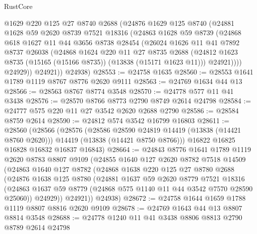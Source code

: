\begin{lexlean}{RustCore}
\begin{coremodule}
          @1629
          @220
          @125
          @27
          @8740
          @2688
          (@24876
            @1629
            @125
            @8740
            (@24881
              @1628
              @59
              @2620
              @8739
              @7521
              @18316
              (@24863
                @1628
                @59
                @8739
                (@24868
                  @618
                  @1627
                  @11
                  @44
                  @3656
                  @8738
                  @28454
                  (@26024
                    @1626
                    @11
                    @41
                    @7892
                    @8737
                    @26038
                    (@24868
                      @1624
                      @220
                      @11
                      @27
                      @8735
                      @2688
                      (@24812 @1623 @8735 (@15165 (@15166 @8735)) (@13838 (@15171 @1623 @11)))
                      @24921))))
              @24929))
          @24921))
      @24938)
@28553 := @24758 @1635
@28560 := @28553 @1641 @1789 @1119 @8767 @8776 @2620 @9111
@28563 := @24769 @1634 @44 @13
@28566 := @28563 @8767 @8774 @3548
@28570 := @24778 @577 @11 @41 @3438
@28576 := @28570 @8766 @8773 @2790 @8749 @2614 @24798
@28584 := @24777 @575 @220 @11 @27 @3542 @2620 @2688 @2790
@28586 := @28584 @8759 @2614
@28590 := @24812 @574 @3542 @16799 @16803
@28611 := @28560
    (@28566
      (@28576
        (@28586 @28590 @24819 @14419 (@13838 (@14421 @8760 @2620)))
        @14419
        (@13838 (@14421 @8750 @8766)))
      @16822
      @16825
      @16828
      @16832
      @16837
      @16843)
@28664 := @24843
    @8776
    @1641
    @1789
    @1119
    @2620
    @8783
    @8807
    @9109
    (@24855
      @1640
      @127
      @2620
      @8782
      @7518
      @14509
      (@24863
        @1640
        @127
        @8782
        (@24868
          @1638
          @220
          @125
          @27
          @8780
          @2688
          (@24876
            @1638
            @125
            @8780
            (@24881
              @1637
              @59
              @2620
              @8779
              @7521
              @18316
              (@24863 @1637 @59 @8779 (@24868 @575 @1140 @11 @44 @3542 @7570 @28590 @25060))
              @24929))
          @24921))
      @24938)
@28672 := @24758 @1644 @1659 @1788 @1119 @8807 @8816 @2620 @9109
@28678 := @24769 @1643 @44 @13 @8807 @8814 @3548
@28688 := @24778 @1240 @11 @41 @3438 @8806 @8813 @2790 @8789 @2614 @24798

\end{coremodule}
\end{lexlean}
